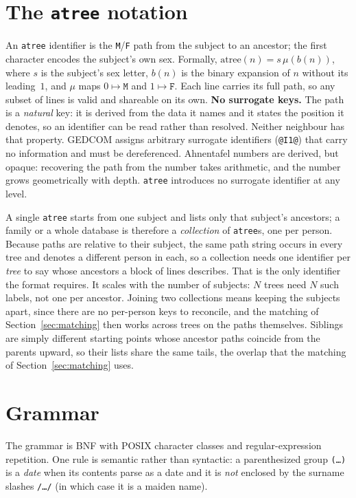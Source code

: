 \documentclass[11pt]{article}
\newcommand{\atree}{\texttt{atree}}
\begin{document}
\section{The \atree{} notation}
\label{sec:notation}
An \atree{} identifier is the \texttt{M}/\texttt{F} path from the subject to an ancestor; the first
character encodes the subject's own sex. Formally, $\mathrm{atree}(n)=s\,\mu(b(n))$, where $s$ is
the subject's sex letter, $b(n)$ is the binary expansion of $n$ without its leading~$1$, and $\mu$
maps $0\mapsto\mathtt{M}$ and $1\mapsto\mathtt{F}$.
Each line carries its full path, so any subset of lines is valid and shareable on its own.
\textbf{No surrogate keys.} The path is a \emph{natural} key: it is derived from the data it names and
it states the position it denotes, so an identifier can be read rather than resolved. Neither neighbour has that property. GEDCOM assigns arbitrary surrogate identifiers
(\texttt{@I1@}) that carry no information and must be dereferenced. Ahnentafel numbers are derived, but opaque: recovering the path from the number takes arithmetic, and the number
grows geometrically with depth. \atree{} introduces no surrogate identifier at any level.

A single \atree{} starts from one subject and lists only that subject's ancestors; a family or a
whole database is therefore a \emph{collection} of \atree{}s, one per person. Because paths are
relative to their subject, the same path string occurs in every tree and denotes a different person in
each, so a collection needs one identifier per \emph{tree} to say whose ancestors a block of lines
describes. That is the only identifier the format requires. It scales with the number of subjects: $N$ trees
need $N$ such labels, not one per ancestor. Joining two collections means keeping the subjects
apart, since there are no per-person keys to reconcile, and the matching of Section~\ref{sec:matching} then works across trees on the paths themselves. Siblings are simply
different starting points whose ancestor paths coincide from the parents upward, so their lists share
the same tails, the overlap that the matching of Section~\ref{sec:matching} uses.

\section{Grammar}
\label{sec:grammar}
The grammar is BNF with POSIX character classes and regular-expression repetition. One rule is
semantic rather than syntactic: a parenthesized group \texttt{(\dots)} is a \emph{date} when its
contents parse as a date and it is \emph{not} enclosed by the surname slashes \texttt{/\dots/} (in
which case it is a maiden name).
\end{document}
